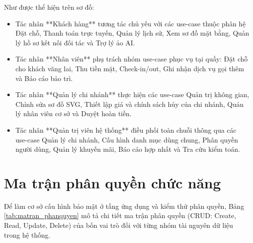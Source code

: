 Như được thể hiện trên sơ đồ:
\begin{itemize}
    \item Tác nhân **Khách hàng** tương tác chủ yếu với các use-case thuộc phân hệ Đặt chỗ, Thanh toán trực tuyến, Quản lý lịch sử, Xem sơ đồ mặt bằng, Quản lý hồ sơ kết nối đối tác và Trợ lý ảo AI.
    \item Tác nhân **Nhân viên** phụ trách nhóm use-case phục vụ tại quầy: Đặt chỗ cho khách vãng lai, Thu tiền mặt, Check-in/out, Ghi nhận dịch vụ gọi thêm và Báo cáo bảo trì.
    \item Tác nhân **Quản lý chi nhánh** thực hiện các use-case Quản trị không gian, Chỉnh sửa sơ đồ SVG, Thiết lập giá và chính sách hủy của chi nhánh, Quản lý nhân viên cơ sở và Duyệt hoàn tiền.
    \item Tác nhân **Quản trị viên hệ thống** điều phối toàn chuỗi thông qua các use-case Quản lý chi nhánh, Cấu hình danh mục dùng chung, Phân quyền người dùng, Quản lý khuyến mãi, Báo cáo hợp nhất và Tra cứu kiểm toán.
\end{itemize}

\section{Ma trận phân quyền chức năng}
\label{sec:ma_tran_phan_quyen}

Để làm cơ sở cấu hình bảo mật ở tầng ứng dụng và kiểm thử phân quyền, Bảng \ref{tab:matran_phanquyen} mô tả chi tiết ma trận phân quyền (CRUD: Create, Read, Update, Delete) của bốn vai trò đối với từng nhóm tài nguyên dữ liệu trong hệ thống.


